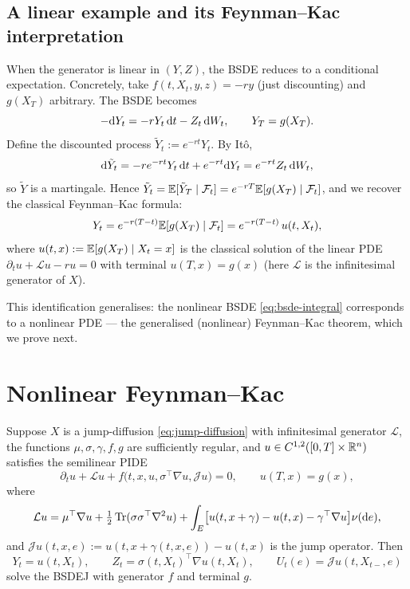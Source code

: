 \subsection{A linear example and its Feynman--Kac interpretation}
\label{subsec:linear-bsde}

When the generator is linear in $(Y, Z)$, the BSDE reduces to a conditional expectation. Concretely, take $f(t, X_t, y, z) = -r y$ (just discounting) and $g(X_T)$ arbitrary. The BSDE becomes
\begin{equation}
  -\mathrm{d} Y_t = -r Y_t \, \mathrm{d} t - Z_t \, \mathrm{d} W_t, \qquad Y_T = g(X_T).
\end{equation}
Define the discounted process $\tilde Y_t := e^{-r t} Y_t$. By It\^o,
\begin{equation}
  \mathrm{d} \tilde Y_t = -r e^{-r t} Y_t \, \mathrm{d} t + e^{-r t} \mathrm{d} Y_t = e^{-r t} Z_t \, \mathrm{d} W_t,
\end{equation}
so $\tilde Y$ is a martingale. Hence $\tilde Y_t = \mathbb{E}[\tilde Y_T \mid \mathcal{F}_t] = e^{-r T} \mathbb{E}[g(X_T) \mid \mathcal{F}_t]$, and we recover the classical Feynman--Kac formula:
\begin{equation}
  Y_t = e^{-r (T - t)} \mathbb{E}[g(X_T) \mid \mathcal{F}_t] = e^{-r(T-t)}\,u(t, X_t),
\end{equation}
where $u(t, x) := \mathbb{E}[g(X_T) \mid X_t = x]$ is the classical solution of the linear PDE $\partial_t u + \mathcal{L} u - r u = 0$ with terminal $u(T, x) = g(x)$ (here $\mathcal{L}$ is the infinitesimal generator of $X$).

This identification generalises: the nonlinear BSDE \eqref{eq:bsde-integral} corresponds to a nonlinear PDE --- the generalised (nonlinear) Feynman--Kac theorem, which we prove next.

\section{Nonlinear Feynman--Kac}
\label{sec:fk}

\begin{theorem}
\label{thm:fk}
Suppose $X$ is a jump-diffusion \eqref{eq:jump-diffusion} with infinitesimal generator $\mathcal{L}$, the functions $\mu, \sigma, \gamma, f, g$ are sufficiently regular, and $u \in C^{1,2}([0, T] \times \mathbb{R}^n)$ satisfies the semilinear PIDE
\begin{equation}
  \partial_t u + \mathcal{L} u + f\bigl(t, x, u, \sigma^\top \nabla u, \mathcal{J} u\bigr) = 0, \qquad u(T, x) = g(x),
  \label{eq:pide}
\end{equation}
where
\[
  \mathcal{L} u = \mu^\top \nabla u + \tfrac{1}{2} \operatorname{Tr}(\sigma \sigma^\top \nabla^2 u) + \int_E \bigl[u(t, x + \gamma) - u(t, x) - \gamma^\top \nabla u\bigr] \nu(\mathrm{d} e),
\]
and $\mathcal{J} u(t, x, e) := u(t, x + \gamma(t, x, e)) - u(t, x)$ is the jump operator. Then
\begin{equation}
  Y_t = u(t, X_t), \qquad Z_t = \sigma(t, X_t)^\top \nabla u(t, X_t), \qquad U_t(e) = \mathcal{J} u(t, X_{t-}, e)
  \label{eq:fk-identification}
\end{equation}
solve the BSDEJ with generator $f$ and terminal $g$.
\end{theorem}

